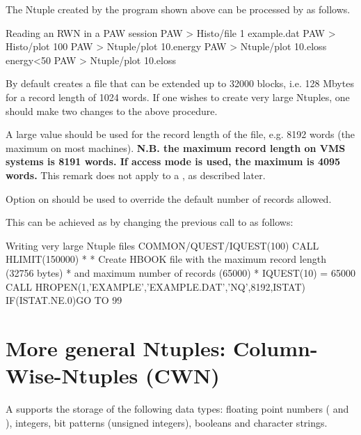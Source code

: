 The Ntuple created by the program shown above can be processed
by \PAW{} as follows.

\begin{XMPt}{Reading an RWN in a PAW session}
            PAW > Histo/file  1  example.dat
            PAW > Histo/plot 100
            PAW > Ntuple/plot 10.energy
            PAW > Ntuple/plot 10.eloss  energy<50
            PAW > Ntuple/plot 10.eloss%
\end{XMPt}

By default  creates a file that can be extended up to
32000 blocks, i.e. 128 Mbytes for a record length 
of 1024 words.
If one wishes to create very large Ntuples, one should
make two changes to the above procedure.

\begin{UL}
\item A large value should be used for the record length of the file,
      e.g. 8192 words (the maximum on most machines).
      {\bf N.B. the maximum record length on VMS systems is 8191 words.
      If access mode  is used, the maximum is 4095 words.}
      This remark does not apply to a \CWN, as described later.
\item Option  on  should be used to override the default
      number of records allowed.
\end{UL}

This can be achieved as by changing the previous call to 
as follows:

\begin{XMPt}{Writing very large Ntuple files}
              COMMON/QUEST/IQUEST(100)
              CALL HLIMIT(150000)
*
*     Create HBOOK file with the maximum record length (32756 bytes)
*     and maximum number of records (65000)
*
              IQUEST(10) = 65000
              CALL HROPEN(1,'EXAMPLE','EXAMPLE.DAT','NQ',8192,ISTAT)
              IF(ISTAT.NE.0)GO TO 99
\end{XMPt}


\section{More general Ntuples: Column-Wise-Ntuples (CWN)}
\label{sec:NtupleCWN}

A \CWN{} supports the storage of the following data types: floating
point numbers ( and ), integers, bit patterns
(unsigned integers), booleans and character strings.

